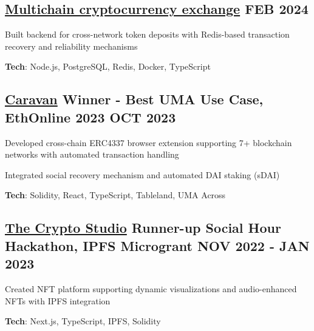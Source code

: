 \documentclass[letter,10pt]{article}
\begin{document}
\subsection{{ \href{https://github.com/Suhel-Kap/crypto-exchanger}{Multichain cryptocurrency exchange} \hfill FEB 2024}}
\begin{zitemize}
  \item Built backend for cross-network token deposits with Redis-based transaction recovery and reliability mechanisms
  \item \textbf{Tech}: Node.js, PostgreSQL, Redis, Docker, TypeScript
\end{zitemize}

\subsection{{ \href{https://github.com/0xabh/caravan}{Caravan} Winner - Best UMA Use Case, EthOnline 2023 \hfill OCT 2023}}
\begin{zitemize}
  \item Developed cross-chain ERC4337 browser extension supporting 7+ blockchain networks with automated transaction handling
  \item Integrated social recovery mechanism and automated DAI staking (sDAI)
  \item \textbf{Tech}: Solidity, React, TypeScript, Tableland, UMA Across
\end{zitemize}

\subsection{{ \href{https://github.com/Suhel-Kap/the-crypto-studio}{The Crypto Studio} Runner-up Social Hour Hackathon, IPFS Microgrant \hfill NOV 2022 - JAN 2023}}
\begin{zitemize}
  \item Created NFT platform supporting dynamic visualizations and audio-enhanced NFTs with IPFS integration
  \item \textbf{Tech}: Next.js, TypeScript, IPFS, Solidity
\end{zitemize}
\end{document}
